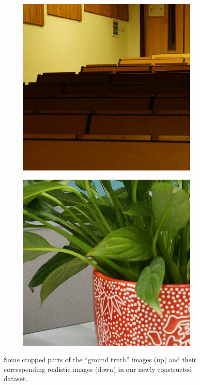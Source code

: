 \begin{figure}
\begin{subfigure}[t]{0.19\textwidth}
    \end{subfigure}
    \hfill
    \begin{subfigure}[t]{0.19\textwidth}
        \centering
        \includegraphics[width=1\textwidth]{images/dataset/Sony_3-5_200_1600_classroom_14_real.JPG}
    \end{subfigure}
    \hfill
    \begin{subfigure}[t]{0.19\textwidth}
        \centering
        \includegraphics[width=1\textwidth]{images/dataset/Sony_4-5_125_3200_plant_10_real.JPG}
    \end{subfigure}
    \hfill
    \caption{Some cropped parts of the ``ground truth'' images (up) and their corresponding realistic images (down) in our newly constructed dataset.}
    \label{fig6-3}
\end{figure}



